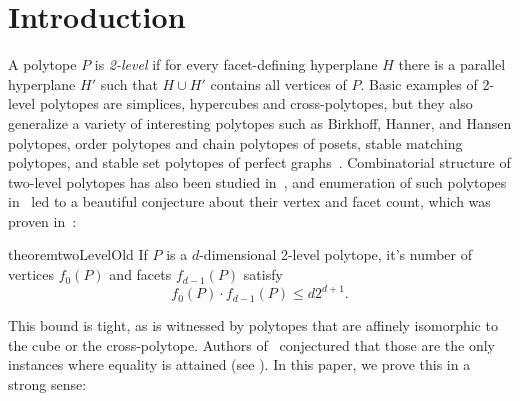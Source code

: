 \section{Introduction}

A polytope $P$ is {\it 2-level} if for every facet-defining hyperplane $H$ there is a parallel hyperplane $H'$ such that $H \cup H'$ contains all vertices of $P$. Basic examples of 2-level polytopes are simplices, hypercubes and cross-polytopes, but they also generalize a variety of interesting polytopes such as Birkhoff, Hanner, and Hansen polytopes, order polytopes and chain polytopes of posets, stable matching polytopes, and stable set polytopes of perfect graphs~\cite{aprile18}. Combinatorial structure of two-level polytopes has also been studied in~\cite{fiorini16}, and enumeration of such polytopes in~\cite{bohn18} led to a beautiful conjecture about their vertex and facet count, which was proven in~\cite{kupavskii22}:
\begin{restatable}{theorem}{twoLevelOld}
    \label{two_level_old_bound}
    If $P$ is a $d$-dimensional 2-level polytope, it's number of vertices $f_0(P)$ and facets $f_{d-1}(P)$ satisfy
    \[
        f_0(P) \cdot f_{d-1}(P) \leq d 2^{d+1}.
    \]
\end{restatable}
\noindent This bound is tight, as is witnessed by polytopes that are affinely isomorphic to the cube or the cross-polytope. Authors of~\cite{bohn18} conjectured that those are the only instances where equality is attained (see \cite{aprile18}). In this paper, we prove this in a strong sense:

